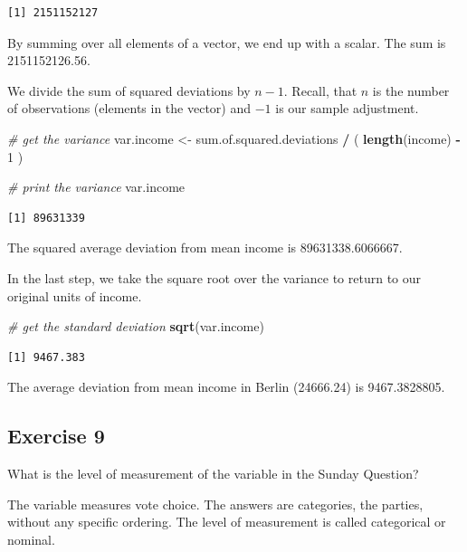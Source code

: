 \documentclass[]{book}
\newenvironment{Shaded}{\begin{snugshade}}{\end{snugshade}}
\newcommand{\KeywordTok}[1]{\textcolor[rgb]{0.13,0.29,0.53}{\textbf{#1}}}
\newcommand{\DecValTok}[1]{\textcolor[rgb]{0.00,0.00,0.81}{#1}}
\newcommand{\StringTok}[1]{\textcolor[rgb]{0.31,0.60,0.02}{#1}}
\newcommand{\CommentTok}[1]{\textcolor[rgb]{0.56,0.35,0.01}{\textit{#1}}}
\newcommand{\OperatorTok}[1]{\textcolor[rgb]{0.81,0.36,0.00}{\textbf{#1}}}
\newcommand{\NormalTok}[1]{#1}
\theoremstyle{definition}
\theoremstyle{definition}
\theoremstyle{definition}
\theoremstyle{remark}
\begin{document}
\begin{verbatim}
[1] 2151152127
\end{verbatim}

By summing over all elements of a vector, we end up with a scalar. The
sum is 2151152126.56.

We divide the sum of squared deviations by \(n-1\). Recall, that \(n\)
is the number of observations (elements in the vector) and \(-1\) is our
sample adjustment.

\begin{Shaded}
\begin{Highlighting}[]
\CommentTok{# get the variance}
\NormalTok{var.income <-}\StringTok{ }\NormalTok{sum.of.squared.deviations }\OperatorTok{/}\StringTok{ }\NormalTok{( }\KeywordTok{length}\NormalTok{(income) }\OperatorTok{-}\StringTok{ }\DecValTok{1}\NormalTok{ )}

\CommentTok{# print the variance}
\NormalTok{var.income}
\end{Highlighting}
\end{Shaded}

\begin{verbatim}
[1] 89631339
\end{verbatim}

The squared average deviation from mean income is 89631338.6066667.

In the last step, we take the square root over the variance to return to
our original units of income.

\begin{Shaded}
\begin{Highlighting}[]
\CommentTok{# get the standard deviation}
\KeywordTok{sqrt}\NormalTok{(var.income)}
\end{Highlighting}
\end{Shaded}

\begin{verbatim}
[1] 9467.383
\end{verbatim}

The average deviation from mean income in Berlin (24666.24) is
9467.3828805.

\subsection{Exercise 9}\label{exercise-9}

What is the level of measurement of the variable in the Sunday Question?

The variable measures vote choice. The answers are categories, the
parties, without any specific ordering. The level of measurement is
called categorical or nominal.
\end{document}

